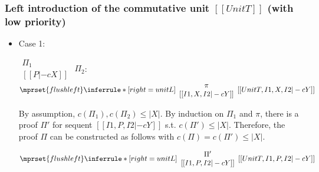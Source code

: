 \subsubsection{Left introduction of the commutative unit $[[UnitT]]$ (with low priority)}
\begin{itemize}
\item Case 1:
      \begin{center}
        \scriptsize
        \begin{math}
          \begin{array}{c}
            \Pi_1 \\
            {[[P |-c X]]}
          \end{array}
        \end{math}
        \qquad\qquad
        $\Pi_2$:
        \begin{math}
          $$\mprset{flushleft}
          \inferrule* [right={\tiny unitL}] {
            {
              \begin{array}{c}
                \pi \\
                {[[I1, X, I2 |-c Y]]}
              \end{array}
            }
          }{[[UnitT, I1, X, I2 |-c Y]]}
        \end{math}
      \end{center}
      By assumption, $c(\Pi_1),c(\Pi_2)\leq |X|$. By induction on $\Pi_1$
      and $\pi$, there is a proof $\Pi'$ for sequent $[[I1, P, I2 |-c Y]]$
      s.t. $c(\Pi') \leq |X|$. Therefore, the proof $\Pi$ can be
      constructed as follows with $c(\Pi) = c(\Pi') \leq |X|$.
      \begin{center}
        \scriptsize
        \begin{math}
          $$\mprset{flushleft}
          \inferrule* [right={\tiny unitL}] {
            {
              \begin{array}{c}
                \Pi' \\
                {[[I1, P, I2 |-c Y]]}
              \end{array}
            }
          }{[[UnitT, I1, P, I2 |-c Y]]}
        \end{math}
      \end{center}


\end{itemize}
